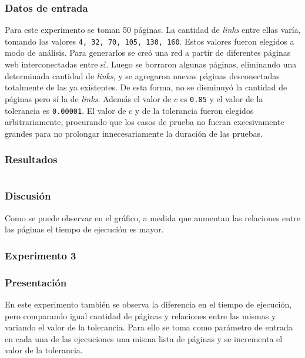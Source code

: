 			\subsubsection*{Datos de entrada} 		
			Para este experimento se toman 50 páginas. La cantidad de \emph{links} entre ellas varía, tomando los valores \texttt{4, 32, 70, 105, 130, 160}. Estos valores fueron elegidos a modo de análisis. Para generarlos se creó una red a partir de diferentes páginas web interconectadas entre sí. Luego se borraron algunas páginas, eliminando una determinada cantidad de \emph{links}, y se agregaron nuevas páginas desconectadas totalmente de las ya existentes. De esta forma, no se disminuyó la cantidad de páginas pero sí la de \emph{links}. Además el valor de $c$ es \texttt{0.85} y el valor de la tolerancia es \texttt{0.00001}. El valor de $c$ y de la tolerancia fueron elegidos arbitrariamente, procurando que los casos de prueba no fueran excesivamente grandes para no prolongar innecesariamente la duración de las pruebas. 
			
			\subsubsection*{Resultados}
				{\centering \begin{tabular}{c}
			    \end{tabular}}


			\subsubsection*{Discusión}
			Como se puede observar en el gráfico, a medida que aumentan las relaciones entre las páginas el tiempo de ejecución es mayor.  

		\subsubsection{Experimento 3}
			\subsubsection*{Presentación}
			En este experimento también se observa la diferencia en el tiempo de ejecución, pero comparando igual cantidad de páginas y relaciones entre las mismas y variando el valor de la tolerancia.
			Para ello se toma como parámetro de entrada en cada una de las ejecuciones una misma lista de páginas y se incrementa el valor de la tolerancia.

